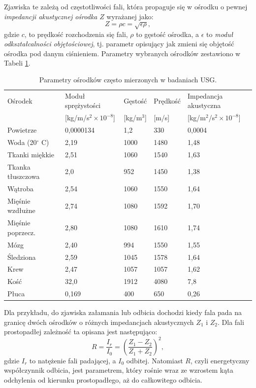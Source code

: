 Zjawiska te zależą od częstotliwości fali, która propaguje się w ośrodku o pewnej \textit{impedancji akustycznej ośrodka} $Z$ wyrażanej jako:
\begin{equation}
Z = \rho c = \sqrt{\epsilon \rho},
\end{equation}
gdzie $c$, to prędkość rozchodzenia się fali, $\rho$ to gęstość ośrodka, a $\epsilon$ to \textit{moduł odkształcalności objętościowej}, tj. parametr opisujący jak zmieni się objętość ośrodka pod danym ciśnieniem. Parametry wybranych ośrodków zestawiono w Tabeli \ref{tab:USG-params}.
\vspace{10px} 
\renewcommand{\arraystretch}{1.2}
\begin{table}[h!]
	\setlength{\tabcolsep}{14pt}
	\centering
	\caption{Parametry ośrodków często mierzonych w badaniach USG.}
	\scriptsize
	\label{tab:USG-params}
	\begin{tabular}{l | l | l | l | l }
		Ośrodek  & Moduł sprężystości  & Gęstość  & Prędkość  & Impedancja akustyczna  \\  
		& [kg/m/s$^2\times10^{-8}$] & [kg/m$^3$] & [m/s] & [kg/m$^2$/s$^2\times10^{-8}$] \\ \hline \hline
		Powietrze   & 0,0000134 & 1,2 & 330 & 0,0004 \\ \hline
		Woda (20$^\circ$ C) & 2,19 & 1000 & 1480 & 1,48  \\ \hline
		Tkanki miękkie & 2,51 & 1060 & 1540 & 1,63  \\ \hline
		Tkanka tłuszczowa & 2,0 & 952 & 1450 & 1,38  \\ \hline
		Wątroba & 2,54 & 1060 & 1550 & 1,64  \\ \hline
		Mięśnie wzdłużne & 2,74 & 1080 & 1592 & 1,70  \\ \hline
		Mięśnie poprzecz. & 2,80 & 1080 & 1610 & 1,74  \\ \hline
		Mózg & 2,40 & 994 & 1550 & 1,55  \\ \hline
		Śledziona & 2,59 & 1045 & 1578 & 1,64  \\ \hline
		Krew & 2,47 & 1057 & 1057 & 1,62  \\ \hline
		Kość & 32,0 & 1912 & 4080 & 7,8  \\ \hline
		Płuca & 0,169 & 400 & 650 & 0,26  \\ \hline
	\end{tabular}
\end{table}
\renewcommand{\arraystretch}{1}

Dla przykładu, do zjawiska załamania lub odbicia dochodzi kiedy fala pada \linebreak na granicę dwóch ośrodków o różnych impedancjach akustycznych $Z_1$ i $Z_2$. Dla fali prostopadłej zależność ta opisana jest następująco:
\begin{equation}
R = \frac{I_r}{I_0} = \left(\frac{Z_1-Z_2}{Z_1+Z_2}\right)^2,
\end{equation}
gdzie $I_r$ to natężenie fali padającej, a $I_0$ odbitej. Natomiast $R$, czyli energetyczny współczynnik odbicia, jest parametrem, który rośnie wraz ze wzrostem kąta odchylenia od kierunku prostopadłego, aż do całkowitego odbicia.

